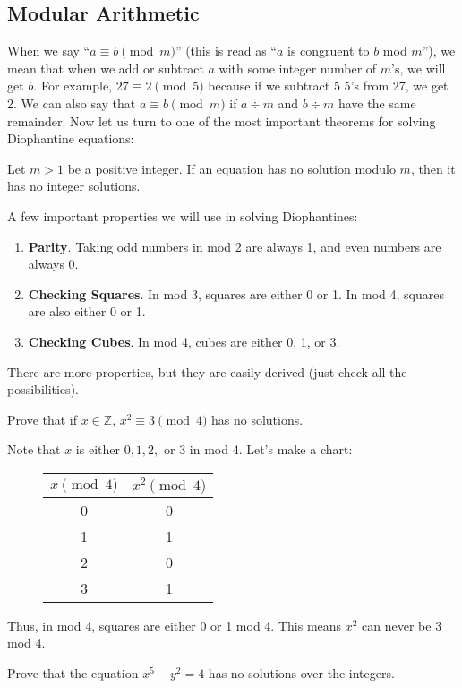 \documentclass[mast]{lucky}
\begin{document}
\subsection{Modular Arithmetic}
When we say ``$a\equiv b\pmod{m}$'' (this is read as ``$a$ is congruent to $b$ mod $m$''), we mean that when we add or subtract $a$ with some integer number of $m$'s, we will get $b$. For example, $27\equiv 2\pmod{5}$ because if we subtract 5 5's from 27, we get 2. We can also say that $a\equiv b\pmod{m}$ if $a\div m$ and $b\div m$ have the same remainder. Now let us turn to one of the most important theorems for solving Diophantine equations:
\begin{theo} 
Let $m>1$ be a positive integer. If an equation has no solution modulo $m$, then it has no integer solutions.
\end{theo}
A few important properties we will use in solving Diophantines:
\begin{enumerate}
\item \textbf{Parity}. Taking odd numbers in mod 2 are always 1, and even numbers are always 0.
\item \textbf{Checking Squares}. In mod 3, squares are either 0 or 1. In mod 4, squares are also either 0 or 1. 
\item \textbf{Checking Cubes}. In mod 4, cubes are either 0, 1, or 3. 
\end{enumerate}
There are more properties, but they are easily derived (just check all the possibilities). 
\begin{exam}[Folklore]
Prove that if $x\in\mathbb{Z}$, $x^2\equiv 3\pmod{4}$ has no solutions.
\end{exam}
\begin{sol}
Note that $x$ is either $0,1,2,$ or 3 in mod 4. Let's make a chart:
\begin{figure}[H]
\centering
\begin{tabular}{c|c}
    $x\pmod{4}$ & $x^2\pmod{4}$\\
    \hline
    0 & 0\\
    1 & 1\\
    2 & 0\\
    3 & 1\\
\end{tabular}
\end{figure}
\noindent
Thus, in mod 4, squares are either 0 or 1 mod 4. This means $x^2$ can never be 3 mod 4.
\end{sol}
\begin{exam}[Balkan MO]
Prove that the equation $x^5-y^2=4$ has no solutions over the integers.
\end{exam}
\end{document}
